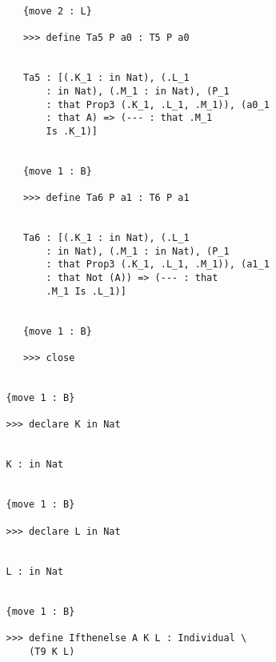 \documentclass{article}
\begin{document}
\begin{verbatim}
      {move 2 : L}

      >>> define Ta5 P a0 : T5 P a0


      Ta5 : [(.K_1 : in Nat), (.L_1 
          : in Nat), (.M_1 : in Nat), (P_1 
          : that Prop3 (.K_1, .L_1, .M_1)), (a0_1 
          : that A) => (--- : that .M_1 
          Is .K_1)]


      {move 1 : B}

      >>> define Ta6 P a1 : T6 P a1


      Ta6 : [(.K_1 : in Nat), (.L_1 
          : in Nat), (.M_1 : in Nat), (P_1 
          : that Prop3 (.K_1, .L_1, .M_1)), (a1_1 
          : that Not (A)) => (--- : that 
          .M_1 Is .L_1)]


      {move 1 : B}

      >>> close


   {move 1 : B}

   >>> declare K in Nat


   K : in Nat


   {move 1 : B}

   >>> declare L in Nat


   L : in Nat


   {move 1 : B}

   >>> define Ifthenelse A K L : Individual \
       (T9 K L)



\end{verbatim}
\end{document}
